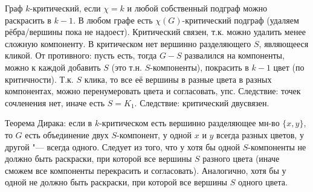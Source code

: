 	Граф $k$-критический, если $\chi=k$ и любой собственный подграф можно раскрасить в $k-1$.
	В любом графе есть $\chi(G)$-критический подграф (удаляем рёбра/вершины пока не надоест).
	Критический связен, т.к. можно удалить менее сложную компоненту.
	В критическом нет вершинно разделяющего $S$, являющееся кликой.
	От противного: пусть есть, тогда $G-S$ развалился на компоненты, можно к каждой добавить $S$ (это т.н. $S$-компоненты), покрасить в $k-1$ цвет (по критичности).
	Т.к. $S$ клика, то все её вершины в разные цвета в разных компонентах, можно перенумеровать цвета и согласовать, упс.
	Следствие: точек сочленения нет, иначе есть $S=K_1$.
	Следствие: критический двусвязен.

	Теорема Дирака: если в $k$-критическом есть вершинно разделяющее мн-во $\{x, y\}$, то
	$G$ есть объединение двух $S$-компонент, у одной $x$ и $y$ всегда разных цветов, у другой "--- всегда одного.
	Следует из того, что у хотя бы одной $S$-компоненты не должно быть раскраски, при которой все вершины $S$ разного цвета
	(иначе сможем все компоненты перекрасить и согласовать).
	Аналогично, хотя бы у одной не должно быть раскраски, при которой все вершины $S$ одного цвета.

\section{} %
	

\section{} %
	
